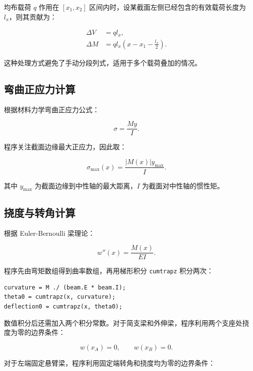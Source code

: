 \documentclass[UTF8,a4paper,12pt]{ctexart}
\numberwithin{equation}{section}
\begin{document}
均布载荷 $q$ 作用在 $[x_1,x_2]$ 区间内时，设某截面左侧已经包含的有效载荷长度为 $l_x$，则其贡献为：

\begin{align}
\Delta V &= ql_x,\\
\Delta M &= ql_x\left(x-x_1-\frac{l_x}{2}\right).
\end{align}

这种处理方式避免了手动分段列式，适用于多个载荷叠加的情况。

\subsection{弯曲正应力计算}

根据材料力学弯曲正应力公式：

\begin{equation}
\sigma=\frac{My}{I}.
\end{equation}

程序关注截面边缘最大正应力，因此取：

\begin{equation}
\sigma_{\max}(x)=\frac{|M(x)|y_{\max}}{I}.
\end{equation}

其中 $y_{\max}$ 为截面边缘到中性轴的最大距离，$I$ 为截面对中性轴的惯性矩。

\subsection{挠度与转角计算}

根据 Euler-Bernoulli 梁理论：

\begin{equation}
w''(x)=\frac{M(x)}{EI}.
\end{equation}

程序先由弯矩数组得到曲率数组，再用梯形积分 \verb|cumtrapz| 积分两次：

\begin{verbatim}
curvature = M ./ (beam.E * beam.I);
theta0 = cumtrapz(x, curvature);
deflection0 = cumtrapz(x, theta0);
\end{verbatim}

数值积分后还需加入两个积分常数。对于简支梁和外伸梁，程序利用两个支座处挠度为零的边界条件：

\begin{equation}
w(x_A)=0,\qquad w(x_B)=0.
\end{equation}

对于左端固定悬臂梁，程序利用固定端转角和挠度均为零的边界条件：
\end{document}
